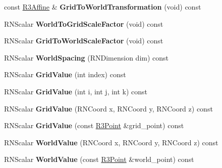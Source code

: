 \begin{DoxyCompactItemize}
\item 
const \hyperlink{class_r3_affine}{R3\+Affine} \& {\bfseries Grid\+To\+World\+Transformation} (void) const \hypertarget{class_r3_grid_a98e58af13264ef62cf73d65b0345eed0}{}\label{class_r3_grid_a98e58af13264ef62cf73d65b0345eed0}

\item 
R\+N\+Scalar {\bfseries World\+To\+Grid\+Scale\+Factor} (void) const \hypertarget{class_r3_grid_a4ddc8f0e71d6c7b91174fd13f79055da}{}\label{class_r3_grid_a4ddc8f0e71d6c7b91174fd13f79055da}

\item 
R\+N\+Scalar {\bfseries Grid\+To\+World\+Scale\+Factor} (void) const \hypertarget{class_r3_grid_a3bcab7a9c9454140671c182b5810b511}{}\label{class_r3_grid_a3bcab7a9c9454140671c182b5810b511}

\item 
R\+N\+Scalar {\bfseries World\+Spacing} (R\+N\+Dimension dim) const \hypertarget{class_r3_grid_ac29850cd40934389397170219d44e7ea}{}\label{class_r3_grid_ac29850cd40934389397170219d44e7ea}

\item 
R\+N\+Scalar {\bfseries Grid\+Value} (int index) const \hypertarget{class_r3_grid_a871c36cc7fe6f9de2a4cd479d2075933}{}\label{class_r3_grid_a871c36cc7fe6f9de2a4cd479d2075933}

\item 
R\+N\+Scalar {\bfseries Grid\+Value} (int i, int j, int k) const \hypertarget{class_r3_grid_a2e80c4ba576665d55ac044b29be5b375}{}\label{class_r3_grid_a2e80c4ba576665d55ac044b29be5b375}

\item 
R\+N\+Scalar {\bfseries Grid\+Value} (R\+N\+Coord x, R\+N\+Coord y, R\+N\+Coord z) const \hypertarget{class_r3_grid_ac1eaa2fcbea166a3e62875531858278c}{}\label{class_r3_grid_ac1eaa2fcbea166a3e62875531858278c}

\item 
R\+N\+Scalar {\bfseries Grid\+Value} (const \hyperlink{class_r3_point}{R3\+Point} \&grid\+\_\+point) const \hypertarget{class_r3_grid_a0c55f4fac41aa4e80737f1255afb185c}{}\label{class_r3_grid_a0c55f4fac41aa4e80737f1255afb185c}

\item 
R\+N\+Scalar {\bfseries World\+Value} (R\+N\+Coord x, R\+N\+Coord y, R\+N\+Coord z) const \hypertarget{class_r3_grid_a0af5826aceb1f4ceb97469015dfc51fd}{}\label{class_r3_grid_a0af5826aceb1f4ceb97469015dfc51fd}

\item 
R\+N\+Scalar {\bfseries World\+Value} (const \hyperlink{class_r3_point}{R3\+Point} \&world\+\_\+point) const \hypertarget{class_r3_grid_a0729fc2c709c4f51192099990b2f41ac}{}\label{class_r3_grid_a0729fc2c709c4f51192099990b2f41ac}


\end{DoxyCompactItemize}
